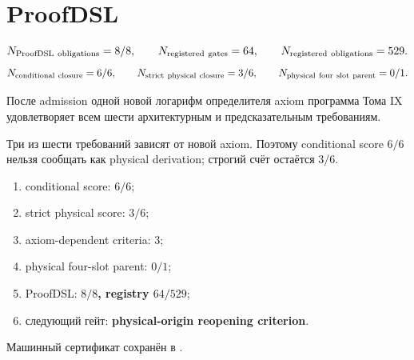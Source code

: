 \section{ProofDSL}

\begin{equation}
 N_{\rm ProofDSL\ obligations}=8/8,
 \qquad N_{\rm registered\ gates}=64,
 \qquad N_{\rm registered\ obligations}=529.
 \label{eq:v9-kms-status-proofdsl}
\end{equation}
\begin{equation}
 N_{\rm conditional\ closure}=6/6,
 \qquad N_{\rm strict\ physical\ closure}=3/6,
 \qquad N_{\rm physical\ four\ slot\ parent}=0/1.
 \label{eq:v9-kms-status-final-ledger}
\end{equation}

\begin{theorem}
После admission одной новой логарифм определителя axiom программа Тома IX удовлетворяет
всем шести архитектурным и предсказательным требованиям.
\end{theorem}

\begin{nogocriterion}
Три из шести требований зависят от новой axiom. Поэтому conditional score
$6/6$ нельзя сообщать как physical derivation; строгий счёт остаётся $3/6$.
\end{nogocriterion}

\begin{protocol}\begin{enumerate}
\item conditional score: \textbf{$6/6$};
\item strict physical score: \textbf{$3/6$};
\item axiom-dependent criteria: \textbf{$3$};
\item physical four-slot parent: \textbf{$0/1$};
\item ProofDSL: \textbf{$8/8$, registry $64/529$};
\item следующий гейт: \textbf{physical-origin reopening criterion}.
\end{enumerate}\end{protocol}

Машинный сертификат сохранён в
.